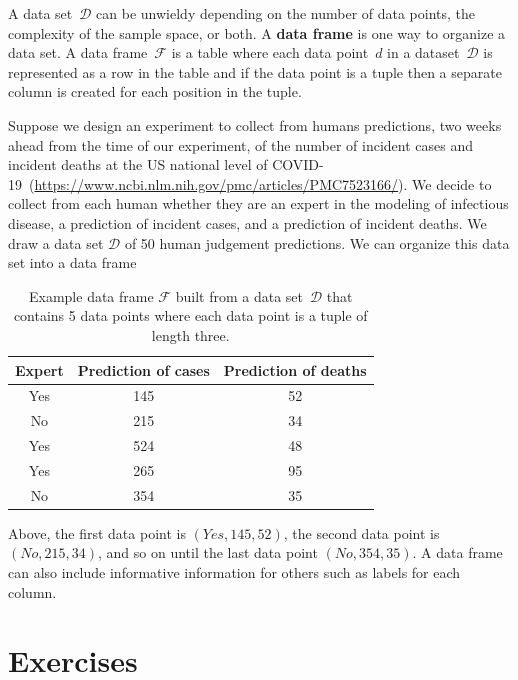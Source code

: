 A data set~$\mathcal{D}$ can be unwieldy depending on the number of data points, the complexity of the sample space, or both.
A \textbf{data frame} is one way to organize a data set.
A data frame~$\mathcal{F}$ is a table where each data point~$d$ in a dataset~$\mathcal{D}$ is represented as a row in the table and if the data point is a tuple then a separate column is created for each position in the tuple.

\ex Suppose we design an experiment to collect from humans predictions, two weeks ahead from the time of our experiment, of the number of incident cases and incident deaths at the US national level of COVID-19~(\url{https://www.ncbi.nlm.nih.gov/pmc/articles/PMC7523166/}). We decide to collect from each human whether they are an expert in the modeling of infectious disease,  a prediction of incident cases, and a prediction of incident deaths. We draw a data set $\mathcal{D}$ of 50 human judgement predictions. We can organize this data set into a data frame 
\begin{table}[ht!]
    \centering
    \begin{tabular}{c|c|c}
    Expert & Prediction of cases & Prediction of deaths\\
    \hline
    Yes     & 145    & 52 \\ 
    No      & 215    & 34 \\
    Yes     & 524    & 48 \\
    Yes     & 265    & 95 \\
    No      & 354    & 35 \\
    \end{tabular}
    \caption{Example data frame $\mathcal{F}$ built from a data set~$\mathcal{D}$ that contains 5 data points where each data point is a tuple of length three.}
\end{table}

Above, the first data point is $(Yes,145,52)$, the second data point is $(No, 215, 34)$, and so on until the last data point $(No, 354, 35)$. A data frame can also include informative information for others such as labels for each column.


\section{Exercises}

